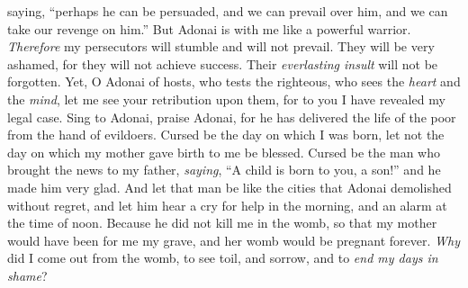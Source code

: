 \begin{biblechapter}
saying, “perhaps he can be persuaded, 
and we can prevail over him, 
and we can take our revenge on him.”
\verse But Adonai is with me like a powerful warrior. 
\textit{Therefore} my persecutors will stumble and will not prevail. 
They will be very ashamed, for they will not achieve success. 
Their \textit{everlasting insult} will not be forgotten.
\verse Yet, O Adonai of hosts, who tests the righteous, 
who sees the \textit{heart} and the \textit{mind}, 
let me see your retribution upon them, 
for to you I have revealed my legal case.
\verse Sing to Adonai, praise Adonai, 
for he has delivered the life of the poor from the hand of evildoers.
\verse Cursed be the day on which I was born, 
let not the day on which my mother gave birth to me be blessed.
\verse Cursed be the man who brought the news to my father, 
\textit{saying}, “A child is born to you, a son!” 
and he made him very glad.
\verse And let that man be like the cities 
that Adonai demolished without regret, 
and let him hear a cry for help in the morning, 
and an alarm at the time of noon.
\verse Because he did not kill me in the womb, 
so that my mother would have been for me my grave, 
and her womb would be pregnant forever.
\verse \textit{Why} did I come out from the womb, 
to see toil, and sorrow, and to \textit{end my days in shame}?
\end{biblechapter}

